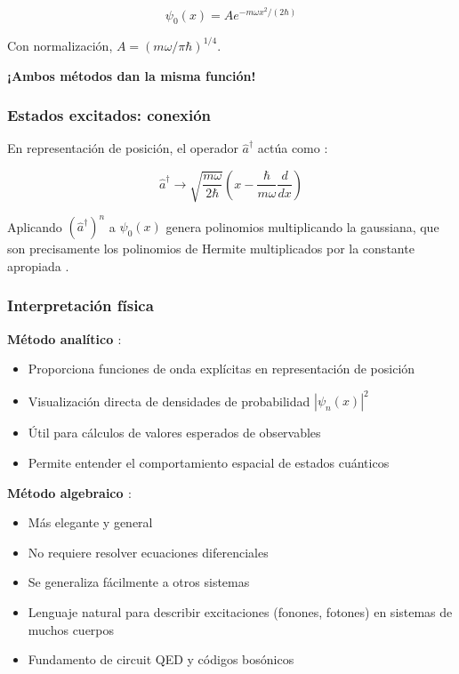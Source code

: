 \documentclass[11pt,a4paper,spanish]{book}
\begin{document}
\begin{equation}
	\psi_0(x) = A e^{-m\omega x^2/(2\hbar)}
\end{equation}

Con normalización, $A = (m\omega/\pi\hbar)^{1/4}$.

\textbf{¡Ambos métodos dan la misma función!}

\subsubsection{Estados excitados: conexión}

En representación de posición, el operador $\hat{a}^\dagger$ actúa como \cite{dirac1930}:

\begin{equation}
	\hat{a}^\dagger \to \sqrt{\frac{m\omega}{2\hbar}}\left(x - \frac{\hbar}{m\omega}\frac{d}{dx}\right)
\end{equation}

Aplicando $(\hat{a}^\dagger)^n$ a $\psi_0(x)$ genera polinomios multiplicando la gaussiana, que son precisamente los polinomios de Hermite multiplicados por la constante apropiada \cite{sakurai2020}.

\subsubsection{Interpretación física}

\textbf{Método analítico \citep{schrodinger1926b}} :
\begin{itemize}
	\item Proporciona funciones de onda explícitas en representación de posición
	\item Visualización directa de densidades de probabilidad $|\psi_n(x)|^2$
	\item Útil para cálculos de valores esperados de observables
	\item Permite entender el comportamiento espacial de estados cuánticos
\end{itemize}

\textbf{Método algebraico \citep{dirac1930}} :
\begin{itemize}
	\item Más elegante y general
	\item No requiere resolver ecuaciones diferenciales
	\item Se generaliza fácilmente a otros sistemas
	\item Lenguaje natural para describir excitaciones (fonones, fotones) en sistemas de muchos cuerpos
	\item Fundamento de circuit QED y códigos bosónicos \citep{blais2021}
\end{itemize}
\end{document}
